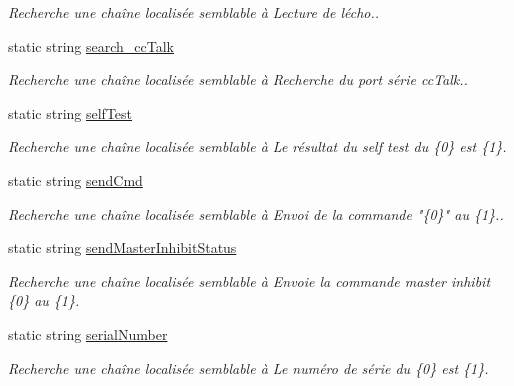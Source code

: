 \begin{DoxyCompactItemize}
\begin{DoxyCompactList}\small\item\em Recherche une chaîne localisée semblable à Lecture de l\textquotesingle{}écho.. \end{DoxyCompactList}\item 
static string \mbox{\hyperlink{class_device_library_1_1messages_text_a3bce2e18d1b8dbc3d29446f4c1fc7cc7}{search\+\_\+cc\+Talk}}
\begin{DoxyCompactList}\small\item\em Recherche une chaîne localisée semblable à Recherche du port série cc\+Talk.. \end{DoxyCompactList}\item 
static string \mbox{\hyperlink{class_device_library_1_1messages_text_a848d1437acc274997c7e914263ed490a}{self\+Test}}
\begin{DoxyCompactList}\small\item\em Recherche une chaîne localisée semblable à Le résultat du self test du \{0\} est \{1\}. \end{DoxyCompactList}\item 
static string \mbox{\hyperlink{class_device_library_1_1messages_text_a6cdf49693beb3766d1b9a2ca4c582a43}{send\+Cmd}}
\begin{DoxyCompactList}\small\item\em Recherche une chaîne localisée semblable à Envoi de la commande "\{0\}" au \{1\}.. \end{DoxyCompactList}\item 
static string \mbox{\hyperlink{class_device_library_1_1messages_text_a36eee29e70368828dc0fb2ff7ec98ac0}{send\+Master\+Inhibit\+Status}}
\begin{DoxyCompactList}\small\item\em Recherche une chaîne localisée semblable à Envoie la commande master inhibit \{0\} au \{1\}. \end{DoxyCompactList}\item 
static string \mbox{\hyperlink{class_device_library_1_1messages_text_a3e4012cb4d076ab167356a3e9319aa36}{serial\+Number}}
\begin{DoxyCompactList}\small\item\em Recherche une chaîne localisée semblable à Le numéro de série du \{0\} est \{1\}. \end{DoxyCompactList}\item 

\end{DoxyCompactItemize}
